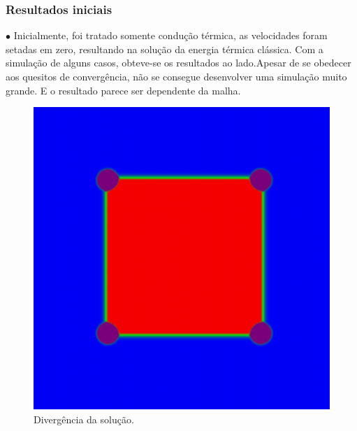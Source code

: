 \documentclass[xcolor=dvipsnames,10pt,aspectratio=169]{beamer}
\begin{document}
	


	
	\begin{frame}
		\frametitle{Resultados iniciais}
		\begin{minipage}[h!]{0.49\textwidth}
			$\bullet$  Inicialmente, foi tratado somente condução térmica, as velocidades foram setadas em zero, resultando na solução da energia térmica clássica. Com a simulação de alguns casos, obteve-se os resultados ao lado.Apesar de se obedecer aos quesitos de convergência, não se consegue desenvolver uma simulação muito grande. E o resultado parece ser dependente da malha.
		\end{minipage}
		\begin{minipage}[h!]{0.49\textwidth}
			\begin{figure}[h!]
				\centering
				\includegraphics[trim = {1cm 1cm 1cm 1cm}, clip , angle=0, scale=0.45]{images/preliminar_results_1}
				\caption{Divergência da solução.}
			\end{figure}
		\end{minipage}
	\end{frame}
\end{document}
